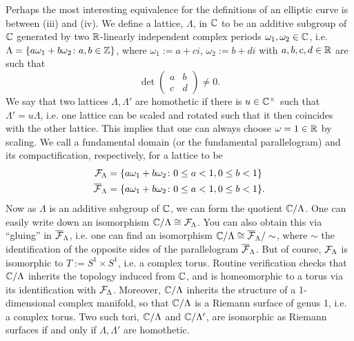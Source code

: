 Perhaps the most interesting equivalence for the definitions of an elliptic curve is between (iii) and (iv). We define a lattice, $\Lambda$, in $\mathbb{C}$ to be an additive subgroup of $\mathbb{C}$ generated by two $\mathbb{R}$-linearly independent complex periods $\omega_1, \omega_2 \in \mathbb{C}$, i.e. $\Lambda= \{ a\omega_1 + b\omega_2 \colon a,b \in \mathbb{Z} \}$, where $\omega_1:= a + ci$, $\omega_2:= b + di$ with $a,b,c,d \in \mathbb{R}$ are such that
	\[
	\det 
	\begin{pmatrix}
	a & b \\
	c & d 
	\end{pmatrix} \neq 0.
	\]
We say that two lattices $\Lambda, \Lambda'$ are homothetic if there is $u \in \mathbb{C}^\times$ such that $\Lambda'= u \Lambda$, i.e. one lattice can be scaled and rotated such that it then coincides with the other lattice. This implies that one can always choose $\omega= 1 \in \mathbb{R}$ by scaling. We call a fundamental domain (or the fundamental parallelogram) and its compactification, respectively, for a lattice to be
	\[
	\begin{aligned}
	\mathcal{F}_\Lambda&= \{ a\omega_1 + b\omega_2 \colon  0 \leq a < 1, 0 \leq b < 1 \} \\
	\overline{\mathcal{F}}_\Lambda&= \{ a\omega_1 + b\omega_2 \colon  0 \leq a < 1, 0 \leq b < 1 \}.
	\end{aligned}
	\]
Now as $\Lambda$ is an additive subgroup of $\mathbb{C}$, we can form the quotient $\mathbb{C}/\Lambda$. One can easily write down an isomorphism $\mathbb{C}/\Lambda \cong \mathcal{F}_\Lambda$. You can also obtain this via ``gluing'' in $\overline{\mathcal{F}}_\Lambda$, i.e. one can find an isomorphism $\mathbb{C}/\Lambda \cong \overline{\mathcal{F}}_\Lambda/\sim$, where $\sim$ the identification of the opposite sides of the parallelogram $\overline{\mathcal{F}}_\Lambda$. But of course, $\mathcal{F}_\Lambda$ is isomorphic to $T:= S^1 \times S^1$, i.e. a complex torus. Routine verification checks that $\mathbb{C}/\Lambda$ inherits the topology induced from $\mathbb{C}$, and is homeomorphic to a torus via its identification with $\mathcal{F}_\Lambda$. Moreover, $\mathbb{C}/\Lambda$ inherits the structure of a 1-dimensional complex manifold, so that $\mathbb{C}/\Lambda$ is a Riemann surface of genus 1, i.e. a complex torus. Two such tori, $\mathbb{C}/\Lambda$ and $\mathbb{C}/\Lambda'$, are isomorphic as Riemann surfaces if and only if $\Lambda, \Lambda'$ are homothetic.


